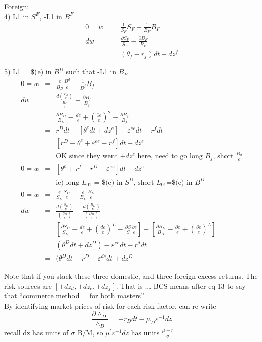\documentclass[]{article}
\begin{document}
Foreign:\\
4) L1 in $S^F$, -L1 in $B^F$
\begin{eqnarray*}
0 = w &=& \frac{1}{S_F} S_F - \frac{1}{B_F} B_F\\
dw &=& \frac{\partial S_F}{S_F}- \frac{\partial B_F}{B_F}\\
&=& (\theta_f - r_f)dt + dz^f
\end{eqnarray*}

5) L1 = \$(e) in $B^D$ such that -L1 in $B_F$
\begin{eqnarray*}
0 = w &=& \frac{e}{B_D}\frac{B^d}{e} - \frac{1}{B^f} B_f\\
dw &=& \frac{d(\frac{B_d}{e})}{\frac{B_d}{e}} - \frac{\partial B_f}{B_f}\\
&=& \frac{\partial B_D}{B_D} - \frac{de}{e} + \left(\frac{\partial e}{e}\right)^2 - \frac{\partial B_f}{B_f}\\
&=& r^D dt - [\theta^e dt + dz^e] + \varepsilon^{ee}dt - r^f dt\\
&=& [r^D - \theta^e + \varepsilon^{ee} -r^f] dt - dz^e\\
&& \mbox{OK since they went $+dz^e$ here, need to go long $B_f$, short $\frac{B_d}{e}$}\\
0=w &=& [\theta^e + r^f - r^D - \varepsilon^{ee}]dt + dz^e\\
&& \mbox{ie) long $L_01$ = \$(e) in $S^D$, short $L_01$=\$(e) in $B^D$ }\\
0=w&=& \frac{e}{S_D} \frac{S_D}{e} - \frac{e}{B_D} \frac{B_D}{e}\\
dw &=& \frac{d(\frac{S_D}{e})}{(\frac{S_D}{e})} - \frac{d(\frac{B_D}{e})}{(\frac{B_D}{e})}\\
&=& \left[\frac{\partial S_D}{S_D} -\frac{de}{e} + \left(\frac{de}{e}\right)^L - \frac{\partial S}{S} \frac{\partial e}{e}\right] - \left[\frac{\partial B_D}{B_D} - \frac{\partial e}{e} + \left(\frac{\partial e}{e}\right)^L \right]\\
&=& (\theta^D dt + dz^D) - \varepsilon^{ee} dt -r^d dt\\
&=& (\theta^D dt -r^D - \varepsilon^{de}dt + dz^D
\end{eqnarray*}

Note that if you stack these three domestic, and three foreign excess returns. The risk sources are $[+dz_d, +dz_e, +dz_f]$. That is ... BCS means after eq 13 to say that ``commerce method =  for both masters''\\

By identifying market prices of risk for each risk factor, can re-write\\
\begin{equation*}
\frac{\partial \wedge_D}{\wedge_D} = -r_D dt - \mu_D \varepsilon ^{-1} dz
\end{equation*}
recall dz has units of $\sigma $ B/M, so $\mu^\prime \varepsilon^{-1} dz$ has units $\frac{\mu -r}{\sigma}$\\
\end{document}
